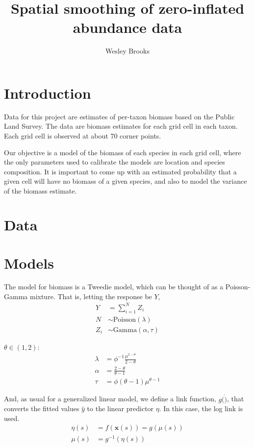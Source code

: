 \documentclass[authoryear, review, 11pt]{elsarticle}
\title{Spatial smoothing of zero-inflated abundance data}
\author{Wesley Brooks}
\begin{document}
\maketitle

\section{Introduction}
Data for this project are estimates of per-taxon biomass based on the Public Land Survey. The data are biomass estimates for each grid cell in each taxon. Each grid cell is observed at about 70 corner points.


Our objective is a  model of the biomass of each species in each grid cell, where the only parameters used to calibrate the models are location and species composition. It is important to come up with an estimated probability that a given cell will have no biomass of a given species, and also to model the variance of the biomass estimate.\\


\section{Data}





\section{Models}
The model for biomass is a Tweedie model, which can be thought of as a Poisson-Gamma mixture. That is, letting the response be $Y$,
\begin{align*}
    Y &= \sum\limits_{i=1}^N Z_i \\
    N &\sim \text{Poisson}(\lambda) \\
    Z_i &\sim \text{Gamma}(\alpha, \tau)
\end{align*}

 $\theta \in (1,2)$:
\begin{align*}
    \lambda &= \phi^{-1} \frac{\mu^{2-\theta}}{2-\theta} \\
    \alpha &= \frac{2-\theta}{\theta-1} \\
    \tau &= \phi (\theta - 1) \mu^{\theta - 1}
\end{align*}

And, as usual for a generalized linear model, we define a link function, $g(\dot)$, that converts the fitted values $\hat{y}$ to the linear predictor $\eta$. In this case, the log link is used.
\begin{align*}
    \eta(s) &= f\left(\bm{x}(s)\right) = g\left(\mu(s)\right)\\
    \mu(s) &= g^{-1}\left(\eta(s)\right)
\end{align*}
\end{document}
